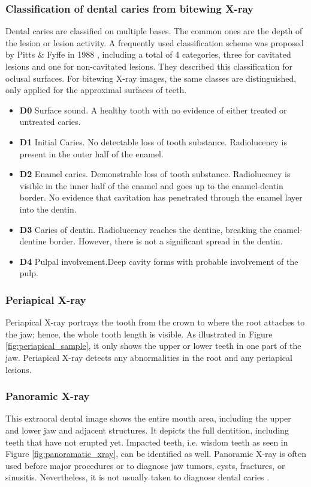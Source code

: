 \subsubsection{Classification of dental caries from bitewing X-ray}
\label{sec:caries_classification}
Dental caries are classified on multiple bases. The common ones are the depth of the lesion or lesion activity. \newline
A frequently used classification scheme was proposed by Pitts \& Fyffe in 1988 \cite{2019a}, including a total of 4 categories, three for cavitated lesions and one for non-cavitated lesions. They described this classification for oclusal surfaces. For bitewing X-ray images, the same classes are distinguished, only applied for the approximal surfaces of teeth.
\begin{itemize}
    \item \textbf{D0} Surface sound. A healthy tooth with no evidence of either treated or untreated caries.
    \item \textbf{D1} Initial Caries. No detectable loss of tooth substance. Radiolucency is present in the outer half of the enamel. 
    \item \textbf{D2} Enamel caries. Demonstrable loss of tooth substance. Radiolucency is visible in the inner half of the enamel and goes up to the enamel-dentin border. No evidence that cavitation has penetrated through the enamel layer into the dentin.
    \item \textbf{D3} Caries of dentin. Radiolucency reaches the dentine, breaking the enamel-dentine border. However, there is not a significant spread in the dentin.
    \item \textbf{D4} Pulpal involvement.Deep cavity forms with probable involvement of the pulp. 
\end{itemize}



\subsubsection{Periapical X-ray}
Periapical X-ray portrays the tooth from the crown to where the root attaches to the jaw; hence, the whole tooth length is visible. As illustrated in Figure \ref{fig:periapical_sample}, it only shows the upper or lower teeth in one part of the jaw.  Periapical X-ray detects any abnormalities in the root and any periapical lesions.

\subsubsection{Panoramic X-ray}
This extraoral dental image shows the entire mouth area, including the upper and lower jaw and adjacent structures. It depicts the full dentition, including teeth that have not erupted yet. Impacted teeth, i.e. wisdom teeth as seen in Figure \ref{fig:panoramatic_xray}, can be identified as well. Panoramic X-ray is often used before major procedures or to diagnose jaw tumors, cysts, fractures, or sinusitis. Nevertheless, it is not usually taken to diagnose dental caries \cite{clevland_xray}.

